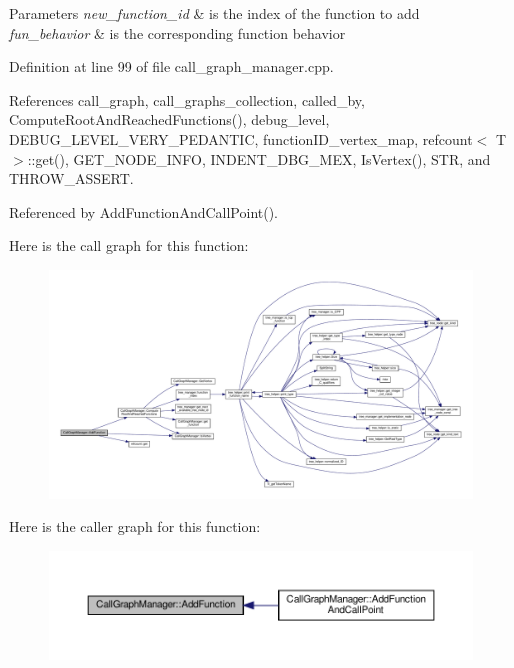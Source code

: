 \begin{DoxyParams}{Parameters}
{\em new\+\_\+function\+\_\+id} & is the index of the function to add \\
\hline
{\em fun\+\_\+behavior} & is the corresponding function behavior \\
\hline
\end{DoxyParams}


Definition at line 99 of file call\+\_\+graph\+\_\+manager.\+cpp.



References call\+\_\+graph, call\+\_\+graphs\+\_\+collection, called\+\_\+by, Compute\+Root\+And\+Reached\+Functions(), debug\+\_\+level, D\+E\+B\+U\+G\+\_\+\+L\+E\+V\+E\+L\+\_\+\+V\+E\+R\+Y\+\_\+\+P\+E\+D\+A\+N\+T\+IC, function\+I\+D\+\_\+vertex\+\_\+map, refcount$<$ T $>$\+::get(), G\+E\+T\+\_\+\+N\+O\+D\+E\+\_\+\+I\+N\+FO, I\+N\+D\+E\+N\+T\+\_\+\+D\+B\+G\+\_\+\+M\+EX, Is\+Vertex(), S\+TR, and T\+H\+R\+O\+W\+\_\+\+A\+S\+S\+E\+RT.



Referenced by Add\+Function\+And\+Call\+Point().

Here is the call graph for this function\+:
\nopagebreak
\begin{figure}[H]
\begin{center}
\leavevmode
\includegraphics[width=350pt]{d5/d96/classCallGraphManager_aa0485c1d4e04aebcb51bcc9a594e1822_cgraph}
\end{center}
\end{figure}
Here is the caller graph for this function\+:
\nopagebreak
\begin{figure}[H]
\begin{center}
\leavevmode
\includegraphics[width=350pt]{d5/d96/classCallGraphManager_aa0485c1d4e04aebcb51bcc9a594e1822_icgraph}
\end{center}
\end{figure}
\mbox{\label{classCallGraphManager_ae1a2605dc9eb6b7259205aff1289b224}} 
